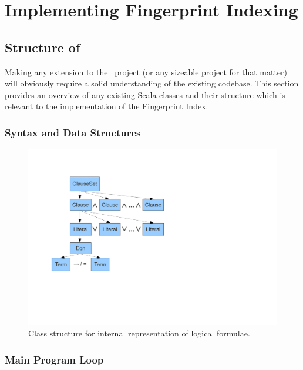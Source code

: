 
\chapter{Implementing Fingerprint Indexing}
\label{cha:method}

\section{Structure of \Beagle}
\label{sec:initial}

Making any extension to the \beagle\ project (or any sizeable project
for that matter) will obviously require a solid
understanding of the existing codebase. This section provides an overview
of any existing Scala classes and their structure which is relevant to the implementation of the Fingerprint Index.

\subsection{Syntax and Data Structures}

\begin{figure}[h]
  \centering
  \includegraphics[clip,trim=2.5cm 5cm 10cm 2cm,width=\textwidth]{resources/logicstructure}
  \caption
   {Class structure for internal representation of logical formulae.}
   \label{fig:expressions}
\end{figure}

\subsection{Main Program Loop}


